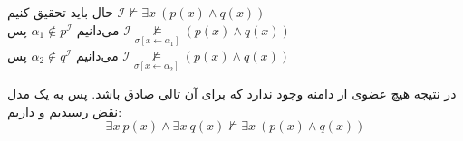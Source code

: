 \documentclass[]{exam}
\begin{document}
حال باید تحقیق کنیم
$\mathscr{I} \not \models \exists x \: (p(x) \land q(x))$
\\
می‌دانیم
$\alpha_1 \notin p^\mathscr{I}$
پس 
$\mathscr{I} \underset{\sigma [x \leftarrow \alpha_1]}{\not \models} (p(x) \land q(x))$
\\
می‌دانیم
$\alpha_2 \notin q^\mathscr{I}$
پس 
$\mathscr{I} \underset{\sigma [x \leftarrow \alpha_2]}{\not \models} (p(x) \land q(x))$

در نتیجه هیچ عضوی از دامنه وجود ندارد که برای آن تالی صادق باشد. پس به یک مدل نقض رسیدیم و داریم:
$$\exists x \: p(x) \land \exists x \: q(x) \not \models \exists x \: (p(x) \land q(x))$$
\end{document}
